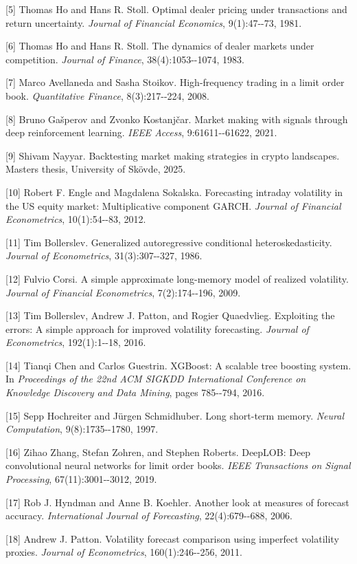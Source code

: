 \documentclass[12pt,a4paper]{article}
\begin{document}
{[}5{]} Thomas Ho and Hans R. Stoll. Optimal dealer pricing under
transactions and return uncertainty. \emph{Journal of Financial
Economics}, 9(1):47-\/-73, 1981.

{[}6{]} Thomas Ho and Hans R. Stoll. The dynamics of dealer markets
under competition. \emph{Journal of Finance}, 38(4):1053-\/-1074, 1983.

{[}7{]} Marco Avellaneda and Sasha Stoikov. High-frequency trading in a
limit order book. \emph{Quantitative Finance}, 8(3):217-\/-224, 2008.

{[}8{]} Bruno Gašperov and Zvonko Kostanjčar. Market making with signals
through deep reinforcement learning. \emph{IEEE Access},
9:61611-\/-61622, 2021.

{[}9{]} Shivam Nayyar. Backtesting market making strategies in crypto
landscapes. Master\textquotesingle s thesis, University of Skövde, 2025.

{[}10{]} Robert F. Engle and Magdalena Sokalska. Forecasting intraday
volatility in the US equity market: Multiplicative component GARCH.
\emph{Journal of Financial Econometrics}, 10(1):54-\/-83, 2012.

{[}11{]} Tim Bollerslev. Generalized autoregressive conditional
heteroskedasticity. \emph{Journal of Econometrics}, 31(3):307-\/-327,
1986.

{[}12{]} Fulvio Corsi. A simple approximate long-memory model of
realized volatility. \emph{Journal of Financial Econometrics},
7(2):174-\/-196, 2009.

{[}13{]} Tim Bollerslev, Andrew J. Patton, and Rogier Quaedvlieg.
Exploiting the errors: A simple approach for improved volatility
forecasting. \emph{Journal of Econometrics}, 192(1):1-\/-18, 2016.

{[}14{]} Tianqi Chen and Carlos Guestrin. XGBoost: A scalable tree
boosting system. In \emph{Proceedings of the 22nd ACM SIGKDD
International Conference on Knowledge Discovery and Data Mining}, pages
785-\/-794, 2016.

{[}15{]} Sepp Hochreiter and Jürgen Schmidhuber. Long short-term memory.
\emph{Neural Computation}, 9(8):1735-\/-1780, 1997.

{[}16{]} Zihao Zhang, Stefan Zohren, and Stephen Roberts. DeepLOB: Deep
convolutional neural networks for limit order books. \emph{IEEE
Transactions on Signal Processing}, 67(11):3001-\/-3012, 2019.

{[}17{]} Rob J. Hyndman and Anne B. Koehler. Another look at measures of
forecast accuracy. \emph{International Journal of Forecasting},
22(4):679-\/-688, 2006.

{[}18{]} Andrew J. Patton. Volatility forecast comparison using
imperfect volatility proxies. \emph{Journal of Econometrics},
160(1):246-\/-256, 2011.
\end{document}
